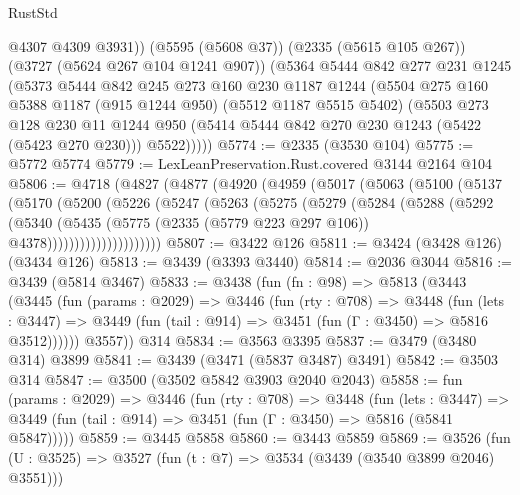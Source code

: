 \begin{lexlean}{RustStd}
\begin{coremodule}
          @4307
          @4309
          @3931))
      (@5595 (@5608 @37))
      (@2335 (@5615 @105 @267))
      (@3727 (@5624 @267 @104 @1241 @907))
      (@5364
        @5444
        @842
        @277
        @231
        @1245
        (@5373
          @5444
          @842
          @245
          @273
          @160
          @230
          @1187
          @1244
          (@5504
            @275
            @160
            @5388
            @1187
            (@915 @1244 @950)
            (@5512 @1187 @5515 @5402)
            (@5503
              @273
              @128
              @230
              @11
              @1244
              @950
              (@5414 @5444 @842 @270 @230 @1243 (@5422 (@5423 @270 @230)))
              @5522)))))
@5774 := @2335 (@3530 @104)
@5775 := @5772 @5774
@5779 := LexLeanPreservation.Rust.covered @3144 @2164 @104
@5806 := @4718
    (@4827
      (@4877
        (@4920
          (@4959
            (@5017
              (@5063
                (@5100
                  (@5137
                    (@5170
                      (@5200
                        (@5226
                          (@5247
                            (@5263
                              (@5275
                                (@5279
                                  (@5284
                                    (@5288
                                      (@5292
                                        (@5340
                                          (@5435
                                            (@5775
                                              (@2335 (@5779 @223 @297 @106))
                                              @4378)))))))))))))))))))))
@5807 := @3422 @126
@5811 := @3424 (@3428 @126) (@3434 @126)
@5813 := @3439 (@3393 @3440)
@5814 := @2036 @3044
@5816 := @3439 (@5814 @3467)
@5833 := @3438
    (fun (fn : @98) =>
    @5813
      (@3443
        (@3445
          (fun (params : @2029) =>
          @3446
            (fun (rty : @708) =>
            @3448
              (fun (lets : @3447) =>
              @3449 (fun (tail : @914) => @3451 (fun (Γ : @3450) => @5816 @3512))))))
        @3557))
    @314
@5834 := @3563 @3395
@5837 := @3479 (@3480 @314) @3899
@5841 := @3439 (@3471 (@5837 @3487) @3491)
@5842 := @3503 @314
@5847 := @3500 (@3502 @5842 @3903 @2040 @2043)
@5858 := fun (params : @2029) =>
  @3446
    (fun (rty : @708) =>
    @3448
      (fun (lets : @3447) =>
      @3449 (fun (tail : @914) => @3451 (fun (Γ : @3450) => @5816 (@5841 @5847)))))
@5859 := @3445 @5858
@5860 := @3443 @5859
@5869 := @3526 (fun (U : @3525) => @3527 (fun (t : @7) => @3534 (@3439 (@3540 @3899 @2046) @3551)))

\end{coremodule}
\end{lexlean}
